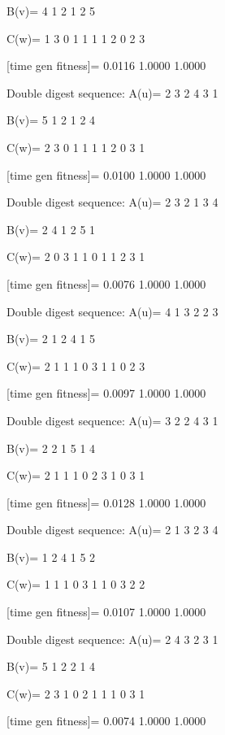 B(v)=
     4     1     2     1     2     5

C(w)=
     1     3     0     1     1     1     1     2     0     2     3

[time gen fitness]=
    0.0116    1.0000    1.0000

Double digest sequence:
A(u)=
     2     3     2     4     3     1

B(v)=
     5     1     2     1     2     4

C(w)=
     2     3     0     1     1     1     1     2     0     3     1

[time gen fitness]=
    0.0100    1.0000    1.0000

Double digest sequence:
A(u)=
     2     3     2     1     3     4

B(v)=
     2     4     1     2     5     1

C(w)=
     2     0     3     1     1     0     1     1     2     3     1

[time gen fitness]=
    0.0076    1.0000    1.0000

Double digest sequence:
A(u)=
     4     1     3     2     2     3

B(v)=
     2     1     2     4     1     5

C(w)=
     2     1     1     1     0     3     1     1     0     2     3

[time gen fitness]=
    0.0097    1.0000    1.0000

Double digest sequence:
A(u)=
     3     2     2     4     3     1

B(v)=
     2     2     1     5     1     4

C(w)=
     2     1     1     1     0     2     3     1     0     3     1

[time gen fitness]=
    0.0128    1.0000    1.0000

Double digest sequence:
A(u)=
     2     1     3     2     3     4

B(v)=
     1     2     4     1     5     2

C(w)=
     1     1     1     0     3     1     1     0     3     2     2

[time gen fitness]=
    0.0107    1.0000    1.0000

Double digest sequence:
A(u)=
     2     4     3     2     3     1

B(v)=
     5     1     2     2     1     4

C(w)=
     2     3     1     0     2     1     1     1     0     3     1

[time gen fitness]=
    0.0074    1.0000    1.0000

